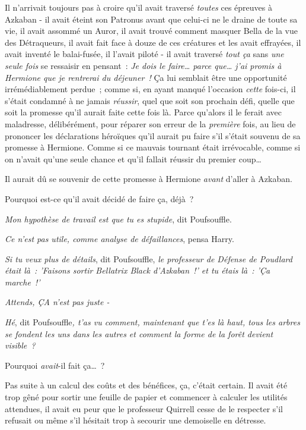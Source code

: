 Il n'arrivait toujours pas à croire qu'il avait traversé \emph{toutes} ces épreuves à Azkaban - il avait éteint son Patronus avant que celui-ci ne le draine de toute sa vie, il avait assommé un Auror, il avait trouvé comment masquer Bella de la vue des Détraqueurs, il avait fait face à douze de ces créatures et les avait effrayées, il avait inventé le balai-fusée, il l'avait piloté - il avait traversé \emph{tout ça} sans \emph{une seule fois} se ressaisir en pensant~: \emph{Je dois le faire… parce que… j'ai promis à Hermione que je rentrerai du déjeuner~!} Ça lui semblait être une opportunité irrémédiablement perdue~; comme si, en ayant manqué l'occasion \emph{cette} fois-ci, il s'était condamné à ne jamais \emph{réussir}, quel que soit son prochain défi, quelle que soit la promesse qu'il aurait faite cette fois là. Parce qu'alors il le ferait avec maladresse, délibérément, pour réparer son erreur de la \emph{première} fois, au lieu de prononcer les déclarations héroïques qu'il aurait pu faire s'il s'était souvenu de sa promesse à Hermione. Comme si ce mauvais tournant était irrévocable, comme si on n'avait qu'une seule chance et qu'il fallait réussir du premier coup…

Il aurait dû se souvenir de cette promesse à Hermione \emph{avant} d'aller à Azkaban.

Pourquoi est-ce qu'il avait décidé de faire ça, déjà~?

\emph{Mon hypothèse de travail est que tu es stupide}, dit Poufsouffle.

\emph{Ce n'est pas utile, comme analyse de défaillances}, pensa Harry.

\emph{Si tu veux plus de détails}, dit Poufsouffle, \emph{le professeur de Défense de Poudlard était là~: 'Faisons sortir Bellatrix Black d'Azkaban~!' et tu étais là~: 'Ça marche~!'}

\emph{Attends, ÇA n'est pas juste -}

\emph{Hé}, dit Poufsouffle\emph{, t'as vu comment, maintenant que t'es là haut, tous les arbres se fondent les uns dans les autres et comment la forme de la forêt devient visible~?}

Pourquoi \emph{avait}-il fait ça…~?

Pas suite à un calcul des coûts et des bénéfices, ça, c'était certain. Il avait été trop gêné pour sortir une feuille de papier et commencer à calculer les utilités attendues, il avait eu peur que le professeur Quirrell cesse de le respecter s'il refusait ou même s'il hésitait trop à secourir une demoiselle en détresse.


